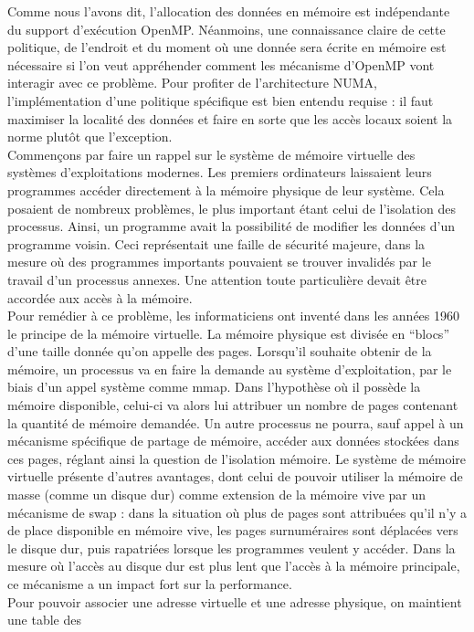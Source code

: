 \documentclass{report}
\begin{document}
Comme nous l'avons dit, l'allocation des données en mémoire est indépendante du support d'exécution OpenMP.
Néanmoins, une connaissance claire de cette politique, de l'endroit et du moment où une donnée sera écrite
en mémoire est nécessaire si l'on veut appréhender comment les mécanisme d'OpenMP vont interagir avec ce
problème. Pour profiter de l'architecture NUMA, l'implémentation d'une politique spécifique est bien 
entendu requise : il faut maximiser la localité des données et faire en sorte que les accès locaux soient
la norme plutôt que l'exception. 
\\Commençons par faire un rappel sur le système de mémoire virtuelle des systèmes d'exploitations modernes.
Les premiers ordinateurs laissaient leurs programmes accéder directement à la mémoire physique de leur
système. Cela posaient de nombreux problèmes, le plus important étant celui de l'isolation des processus.
Ainsi, un programme avait la possibilité de modifier les données d'un programme voisin. Ceci représentait
une faille de sécurité majeure, dans la mesure où des programmes importants pouvaient se trouver invalidés
par le travail d'un processus annexes. Une attention toute particulière devait être accordée aux accès 
à la mémoire.
\\Pour remédier à ce problème, les informaticiens ont inventé dans les années 1960 le principe de la 
mémoire virtuelle. La mémoire physique est divisée en ``blocs'' d'une taille donnée qu'on appelle
des pages. Lorsqu'il souhaite obtenir de la mémoire, un processus va en faire la demande au système
d'exploitation, par le biais d'un appel système comme mmap. Dans l'hypothèse où il possède la mémoire 
disponible, celui-ci va alors lui attribuer un nombre de pages contenant la quantité de mémoire 
demandée. Un autre processus ne pourra, sauf appel à un mécanisme spécifique de partage de mémoire, 
accéder aux données stockées dans ces pages, réglant ainsi la question de l'isolation mémoire. Le 
système de mémoire virtuelle présente d'autres avantages, dont celui de pouvoir utiliser la mémoire 
de masse (comme un disque dur) comme extension de la mémoire vive par un mécanisme de swap : dans 
la situation où plus de pages sont attribuées qu'il n'y a de place disponible en mémoire vive, les 
pages surnuméraires sont déplacées vers le disque dur, puis rapatriées lorsque les programmes veulent
y accéder. Dans la mesure où l'accès au disque dur est plus lent que l'accès à la mémoire principale,
ce mécanisme a un impact fort sur la performance.
\\Pour pouvoir associer une adresse virtuelle et une adresse physique, on maintient une table des 
\end{document}
